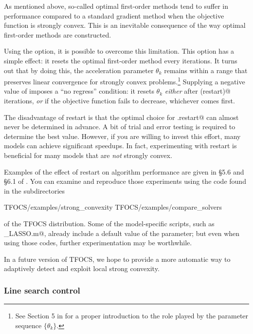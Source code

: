 \documentclass{article}
\newcommand{\<}{\langle}
\renewcommand{\>}{\rangle}
\begin{document}
As mentioned above, so-called optimal first-order methods tend to suffer
in performance compared to a standard gradient method when the objective
function is strongly convex. This is an inevitable consequence of the
way optimal first-order methods are constructed.

Using the \verb@restart@ option, it is possible to overcome this
limitation. This option has a simple effect: it resets the optimal
first-order method every \verb@restart@ iterations. It turns out that
by doing this, the acceleration parameter $\theta_k$ remains within a
range that preserves linear convergence for strongly convex
problems.\footnote{See Section 5 in \cite{TFOCS} for a proper introduction to
the role played by the parameter sequence $\{\theta_k\}$.} Supplying a negative
value of \verb@restart@ imposes a ``no regress'' condition: it resets
$\theta_k$ \emph{either} after \verb@abs(restart)@ iterations,
\emph{or} if the objective function fails to decrease, whichever comes
first.

The disadvantage of restart is that the optimal choice for
\verb@opts.restart@ can almost never be determined in advance.
A bit of trial and error testing
is required to determine the best value.
However, if you are willing to invest this effort, many models
can achieve significant speedups. In fact, experimenting with
restart is beneficial for many models that are \emph{not}
strongly convex.

Examples of 
the effect of restart on algorithm performance are given in \S5.6 and 
\S6.1 of \cite{TFOCS}. You can examine and reproduce those
experiments using the code found in the subdirectories
\begin{code}
	TFOCS/examples/strong_convexity
	TFOCS/examples/compare_solvers
\end{code}
of the TFOCS distribution. Some of the model-specific scripts,
such as \verb@solver_LASSO.m@, already include a default value 
of the \verb@restart@ parameter; but even when using those codes,
further experimentation may be worthwhile.

In a future version of TFOCS, we hope to provide a more automatic
way to adaptively detect and exploit local strong convexity.

\subsubsection{Line search control}
\end{document}
